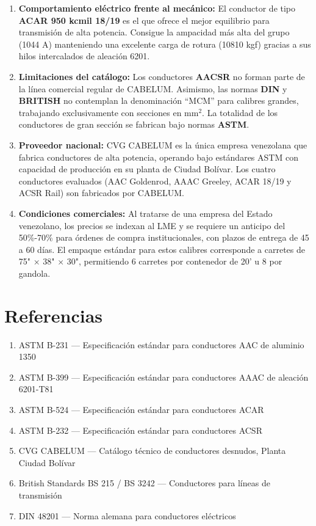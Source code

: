 \documentclass[12pt,a4paper]{article}
\begin{document}
\begin{enumerate}
    \item \textbf{Comportamiento eléctrico frente al mecánico:} El conductor de
        tipo \textbf{ACAR 950 kcmil 18/19} es el que ofrece el mejor equilibrio
        para transmisión de alta potencia. Consigue la ampacidad más alta del
        grupo (1044 A) manteniendo una excelente carga de rotura (10810 kgf)
        gracias a sus hilos intercalados de aleación 6201.

    \item \textbf{Limitaciones del catálogo:} Los conductores \textbf{AACSR} no
        forman parte de la línea comercial regular de CABELUM. Asimismo, las
        normas \textbf{DIN} y \textbf{BRITISH} no contemplan la denominación
        ``MCM'' para calibres grandes, trabajando exclusivamente con secciones
        en mm$^2$. La totalidad de los conductores de gran sección se fabrican
        bajo normas \textbf{ASTM}.

    \item \textbf{Proveedor nacional:} CVG CABELUM es la única empresa
        venezolana que fabrica conductores de alta potencia, operando bajo
        estándares ASTM con capacidad de producción en su planta de Ciudad
        Bolívar. Los cuatro conductores evaluados (AAC Goldenrod, AAAC Greeley,
        ACAR 18/19 y ACSR Rail) son fabricados por CABELUM.

    \item \textbf{Condiciones comerciales:} Al tratarse de una empresa del
        Estado venezolano, los precios se indexan al LME y se requiere un
        anticipo del 50\%-70\% para órdenes de compra institucionales, con
        plazos de entrega de 45 a 60 días. El empaque estándar para estos
        calibres corresponde a carretes de 75" × 38" × 30", permitiendo
        6 carretes por contenedor de 20' u 8 por gandola.
\end{enumerate}

\section{Referencias}

\begin{enumerate}
    \item ASTM B-231 --- Especificación estándar para conductores AAC de aluminio 1350
    \item ASTM B-399 --- Especificación estándar para conductores AAAC de aleación 6201-T81
    \item ASTM B-524 --- Especificación estándar para conductores ACAR
    \item ASTM B-232 --- Especificación estándar para conductores ACSR
    \item CVG CABELUM --- Catálogo técnico de conductores desnudos, Planta Ciudad Bolívar
    \item British Standards BS 215 / BS 3242 --- Conductores para líneas de transmisión
    \item DIN 48201 --- Norma alemana para conductores eléctricos
\end{enumerate}
\end{document}

